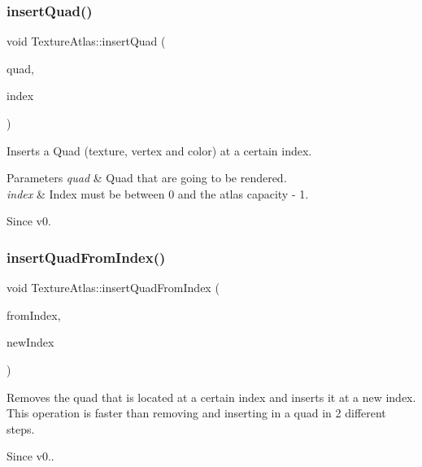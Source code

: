 \subsubsection{\texorpdfstring{insert\+Quad()}{insertQuad()}\hspace{0.1cm}{\footnotesize\ttfamily [2/2]}}
{\footnotesize\ttfamily void Texture\+Atlas\+::insert\+Quad (\begin{DoxyParamCaption}\item[{\hyperlink{structV3F__C4B__T2F__Quad}{V3\+F\+\_\+\+C4\+B\+\_\+\+T2\+F\+\_\+\+Quad} $\ast$}]{quad,  }\item[{ssize\+\_\+t}]{index }\end{DoxyParamCaption})}

Inserts a Quad (texture, vertex and color) at a certain index. 
\begin{DoxyParams}{Parameters}
{\em quad} & Quad that are going to be rendered. \\
\hline
{\em index} & Index must be between 0 and the atlas capacity -\/ 1. \\
\hline
\end{DoxyParams}
\begin{DoxySince}{Since}
v0. 
\end{DoxySince}
\mbox{\label{classTextureAtlas_a5808a77487d3f789156a93ceb18df85b}} 
\subsubsection{\texorpdfstring{insert\+Quad\+From\+Index()}{insertQuadFromIndex()}\hspace{0.1cm}{\footnotesize\ttfamily [1/2]}}
{\footnotesize\ttfamily void Texture\+Atlas\+::insert\+Quad\+From\+Index (\begin{DoxyParamCaption}\item[{ssize\+\_\+t}]{from\+Index,  }\item[{ssize\+\_\+t}]{new\+Index }\end{DoxyParamCaption})}

Removes the quad that is located at a certain index and inserts it at a new index. This operation is faster than removing and inserting in a quad in 2 different steps. \begin{DoxySince}{Since}
v0.. 
\end{DoxySince}
\mbox{\label{classTextureAtlas_a5808a77487d3f789156a93ceb18df85b}} 
